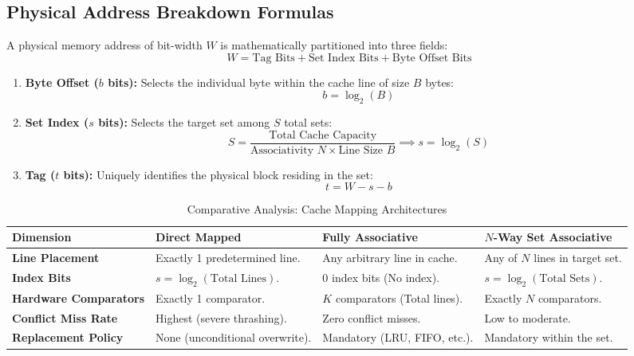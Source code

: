 \subsection{Physical Address Breakdown Formulas}
A physical memory address of bit-width $W$ is mathematically partitioned into three fields:
\begin{equation}
\label{eq:address_partition}
W = \text{Tag Bits} + \text{Set Index Bits} + \text{Byte Offset Bits}
\end{equation}
\begin{enumerate}[label=\bfseries\arabic*.]
    \item \textbf{Byte Offset ($b$ bits):} Selects the individual byte within the cache line of size $B$ bytes:
    \begin{equation}
    \label{eq:offset_formula}
    b = \log_2(B)
    \end{equation}
    \item \textbf{Set Index ($s$ bits):} Selects the target set among $S$ total sets:
    \begin{equation}
    \label{eq:set_formula}
    S = \frac{\text{Total Cache Capacity}}{\text{Associativity } N \times \text{Line Size } B} \implies s = \log_2(S)
    \end{equation}
    \item \textbf{Tag ($t$ bits):} Uniquely identifies the physical block residing in the set:
    \begin{equation}
    \label{eq:tag_formula}
    t = W - s - b
    \end{equation}
\end{enumerate}

\begin{table}[htbp]
\centering
\small
\caption{Comparative Analysis: Cache Mapping Architectures}
\label{tab:cache_mapping}
\begin{tabularx}{\textwidth}{l X X X}
\toprule
\textbf{Dimension} & \textbf{Direct Mapped} & \textbf{Fully Associative} & \textbf{$N$-Way Set Associative} \\
\midrule
\textbf{Line Placement} & Exactly 1 predetermined line. & Any arbitrary line in cache. & Any of $N$ lines in target set. \\
\textbf{Index Bits} & $s = \log_2(\text{Total Lines})$. & $0$ index bits (No index). & $s = \log_2(\text{Total Sets})$. \\
\textbf{Hardware Comparators} & Exactly 1 comparator. & $K$ comparators (Total lines). & Exactly $N$ comparators. \\
\textbf{Conflict Miss Rate} & Highest (severe thrashing). & Zero conflict misses. & Low to moderate. \\
\textbf{Replacement Policy} & None (unconditional overwrite). & Mandatory (LRU, FIFO, etc.). & Mandatory within the set. \\
\bottomrule
\end{tabularx}
\end{table}

